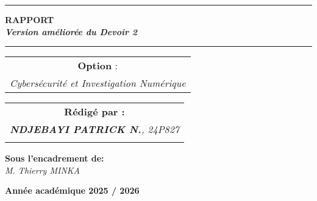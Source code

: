 \documentclass[12pt,a4paper]{article}
\begin{document}
\begin{titlepage}
\begin{center}
		\vspace{0.5cm}
		\begin{tabular}{l*{40}{@{\hskip 3.5cm}c@{\hskip5cm}} p{3.5cm} r}
		\end{tabular}
		
		\noindent\rule{\textwidth}{0.7mm}
		\Large{{\textbf{RAPPORT}}}\\
		\Large{{\textbf{\textit{Version améliorée du Devoir 2}}}}
		\noindent\rule{\textwidth}{0.7mm}
	\end{center}
		
	\begin{center}
	\begin{tabular}{c}
		
		\vspace{0.1cm}
		\normalsize
	
	
		\vspace{0.1cm}
		\normalsize\textbf{Option }:\\			
		\textsl{Cybersécurité et Investigation Numérique}
		
	\end{tabular}
	\end{center}
		
	\begin{center}
		\normalsize %
		\begin{tabular}{c}
			\vspace{0.07cm}
			\hspace{0.02cm} \textbf{\textbf{Rédigé par :}}\\
			
			\hspace{0.02cm} \textsl{\textbf{NDJEBAYI PATRICK N.}, 24P827}\\\\
			
			
		\end{tabular}
	\end{center}
	
	\begin{center}
	\hspace{0.02cm} \textbf{Sous l'encadrement de:}\\
	\hspace{0.02cm} \textsl{M. Thierry MINKA}
	\end{center}
	
    
	\vspace{2cm}
	\begin{center}
		\textbf{Année académique 2025 / 2026}
	\end{center}
		
	\vspace{-1.4cm}
	
		
	\vfill%
	
\end{titlepage}
\end{document}
